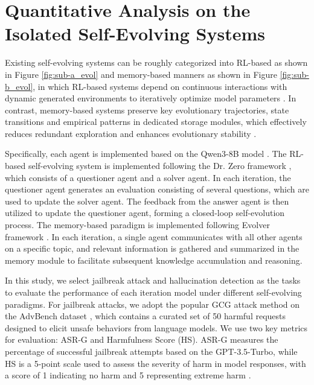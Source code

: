 \documentclass{article}
\theoremstyle{definition}
\theoremstyle{plain}
\begin{document}
\section{Quantitative Analysis on the Isolated Self-Evolving Systems}

Existing self-evolving systems \cite{fang2025comprehensive} can be roughly categorized into RL-based as shown in Figure \ref{fig:sub-a_evol} and memory-based manners as shown in Figure \ref{fig:sub-b_evol}, in which RL-based systems depend on continuous interactions with dynamic generated environments to iteratively optimize model parameters \cite{wang2025ragen, qi2024webrl}. 
In contrast, memory-based systems preserve key evolutionary trajectories, state transitions and empirical patterns in dedicated storage modules, which effectively reduces redundant exploration and enhances evolutionary stability \cite{wang2023voyager, xiong2025memory}. 

Specifically, each agent is implemented based on the Qwen3-8B model \cite{yang2025qwen3}. The RL-based self-evolving system is implemented following the Dr. Zero framework \cite{yue2026dr}, which consists of a questioner agent and a solver agent. In each iteration, the questioner agent generates an evaluation consisting of several questions, which are used to update the solver agent. The feedback from the answer agent is then utilized to update the questioner agent, forming a closed-loop self-evolution process.
The memory-based paradigm is implemented following Evolver framework \cite{wu2025evolver}. In each iteration, a single agent communicates with all other agents on a specific topic, and relevant information is gathered and summarized in the memory module to facilitate subsequent knowledge accumulation and reasoning.

In this study, we select jailbreak attack and hallucination detection as the tasks to evaluate the performance of each iteration model under different self-evolving paradigms. For jailbreak attacks, we adopt the popular GCG attack method \cite{zou2023universal} on the AdvBench dataset \cite{zou2023universal}, which contains a curated set of 50 harmful requests designed to elicit unsafe behaviors from language models. We use two key metrics for evaluation: ASR-G and Harmfulness Score (HS). ASR-G measures the percentage of successful jailbreak attempts based on the GPT-3.5-Turbo, while HS is a 5-point scale used to assess the severity of harm in model responses, with a score of 1 indicating no harm and 5 representing extreme harm \cite{qi2023fine}.
\end{document}
